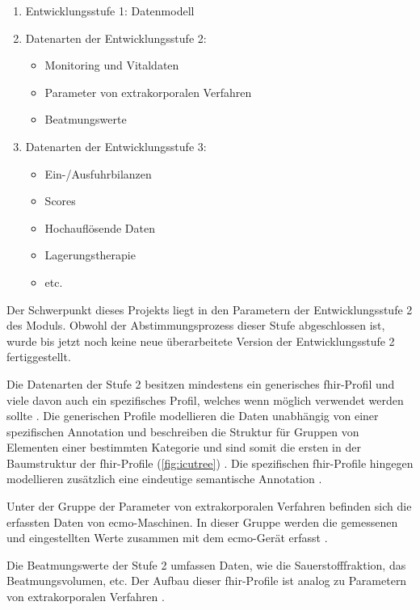 \begin{enumerate}
	\item Entwicklungsstufe 1: Datenmodell
	\item Datenarten der Entwicklungsstufe 2:
	\begin{itemize}
		\item Monitoring und Vitaldaten
		\item Parameter von extrakorporalen Verfahren
		\item Beatmungswerte
	\end{itemize}
	\item Datenarten der Entwicklungsstufe 3:
	\begin{itemize}
		\item Ein-/Ausfuhrbilanzen
		\item Scores
		\item Hochauflösende Daten
		\item Lagerungstherapie
		\item etc.
	\end{itemize}
\end{enumerate}

 Der Schwerpunkt dieses Projekts liegt in den Parametern der Entwicklungsstufe 2 des Moduls. Obwohl der Abstimmungsprozess dieser Stufe abgeschlossen ist, wurde bis jetzt noch keine neue überarbeitete Version der Entwicklungsstufe 2 fertiggestellt.

 Die Datenarten der Stufe 2 besitzen mindestens ein generisches \ac{fhir}-Profil und viele davon auch ein spezifisches Profil, welches wenn möglich verwendet werden sollte \cite{icukdz, modicuvid}. Die generischen Profile modellieren die Daten unabhängig von einer spezifischen Annotation und beschreiben die Struktur für Gruppen von Elementen einer bestimmten Kategorie und sind somit die ersten in der Baumstruktur der \ac{fhir}-Profile (\ref{fig:icutree}) \cite{icukdz}. Die spezifischen \ac{fhir}-Profile hingegen modellieren zusätzlich eine eindeutige semantische Annotation \cite{modicuvid}.
 
 Unter der Gruppe der Parameter von extrakorporalen Verfahren befinden sich die erfassten Daten von \ac{ecmo}-Maschinen. In dieser Gruppe werden die gemessenen und eingestellten Werte zusammen mit dem \ac{ecmo}-Gerät erfasst \cite{icukdz}. 
 
 Die Beatmungswerte der Stufe 2 umfassen Daten, wie die Sauerstofffraktion, das Beatmungsvolumen, etc. Der Aufbau dieser \ac{fhir}-Profile ist analog zu Parametern von extrakorporalen Verfahren \cite{icukdz}.

